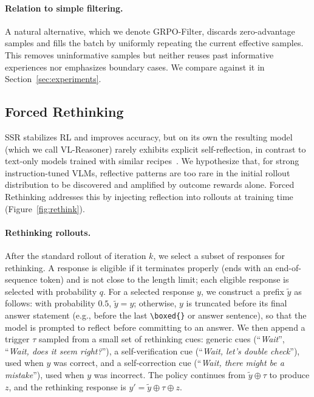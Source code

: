 \documentclass{article}
\begin{document}
\paragraph{Relation to simple filtering.} A natural alternative, which we denote GRPO-Filter, discards zero-advantage samples and fills the batch by uniformly repeating the current effective samples. This removes uninformative samples but neither reuses past informative experiences nor emphasizes boundary cases. We compare against it in Section~\ref{sec:experiments}.

\subsection{Forced Rethinking}
\label{sec:rethink}

SSR stabilizes RL and improves accuracy, but on its own the resulting model (which we call VL-Reasoner) rarely exhibits explicit self-reflection, in contrast to text-only models trained with similar recipes~\citep{deepseek-r1}. We hypothesize that, for strong instruction-tuned VLMs, reflective patterns are too rare in the initial rollout distribution to be discovered and amplified by outcome rewards alone. Forced Rethinking addresses this by injecting reflection into rollouts at training time (Figure~\ref{fig:rethink}).

\paragraph{Rethinking rollouts.} After the standard rollout of iteration $k$, we select a subset of responses for rethinking. A response is eligible if it terminates properly (ends with an end-of-sequence token) and is not close to the length limit; each eligible response is selected with probability $q$. For a selected response $y$, we construct a prefix $\tilde{y}$ as follows: with probability $0.5$, $\tilde{y}=y$; otherwise, $y$ is truncated before its final answer statement (e.g., before the last \texttt{\textbackslash boxed\{\}} or answer sentence), so that the model is prompted to reflect before committing to an answer. We then append a trigger $\tau$ sampled from a small set of rethinking cues: generic cues (``\emph{Wait}'', ``\emph{Wait, does it seem right?}''), a self-verification cue (``\emph{Wait, let's double check}''), used when $y$ was correct, and a self-correction cue (``\emph{Wait, there might be a mistake}''), used when $y$ was incorrect. The policy continues from $\tilde{y}\oplus\tau$ to produce $z$, and the rethinking response is $y'=\tilde{y}\oplus\tau\oplus z$.
\end{document}
